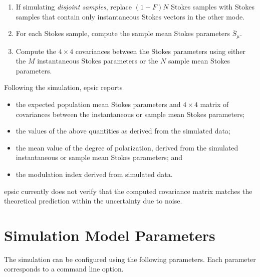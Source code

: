 \documentclass[fullpage]{article}
\newcommand{\irow}{\mu} \newcommand{\icol}{\nu}
\begin{document}
\begin{enumerate}
\item If simulating \emph{disjoint samples}, replace $(1-F)N$ Stokes
  samples with Stokes samples that contain only instantaneous
  Stokes vectors in the other mode.

\item For each Stokes sample, compute the sample mean Stokes
  parameters $\bar{S}_\irow$.

\item Compute the $4\times4$ covariances between the Stokes parameters
  using either the $M$ instantaneous Stokes parameters or the $N$
  sample mean Stokes parameters.
    
\end{enumerate}
%

Following the simulation, {\sc epsic} reports
\begin{itemize}
  \item the expected population mean Stokes parameters and $4\times4$
    matrix of covariances between the instantaneous or sample mean
    Stokes parameters;

  \item the values of the above quantities as derived from the
    simulated data;

  \item the mean value of the degree of polarization, derived from the
    simulated instantaneous or sample mean Stokes parameters; and

  \item the modulation index derived from simulated data.
\end{itemize}

{\sc epsic} currently does not verify that the computed covariance
matrix matches the theoretical prediction within the uncertainty due
to noise.

\newpage

\section{ Simulation Model Parameters }

The simulation can be configured using the following parameters.  Each
parameter corresponds to a command line option.
\end{document}
